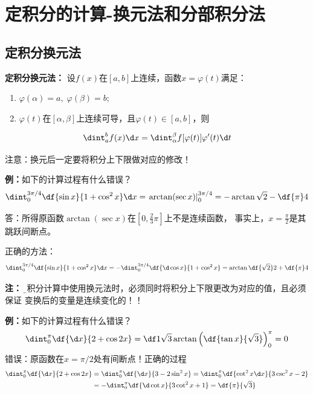 \section{定积分的计算-换元法和分部积分法}

\subsection{定积分换元法}

\begin{thx}
	{\bf 定积分换元法：}
	设$f(x)$在$[a,b]$上连续，函数$x=\varphi(t)$满足：
	\begin{enumerate}[(1)]
	  \setlength{\itemindent}{1cm}
	  \item $\varphi(\alpha)=a,\;\varphi(\beta)=b$;
	  \item $\varphi(t)$在$[\alpha,\beta]$上连续可导，且$\varphi(t)\in[a,b]$，则
	\end{enumerate}
	$$\dint_a^bf(x)\d
	x=\dint_{\alpha}^{\beta}f[\varphi(t)]\varphi'(t)\d t$$
\end{thx}

注意：换元后一定要将积分上下限做对应的修改！

{\bf 例：}如下的计算过程有什么错误？
$$\dint_0^{3\pi/4}\df{\sin x}{1+\cos^2x}\d x
=\left.\arctan(\sec x)\right|_0^{3\pi/4}=-\arctan\sqrt2-\df{\pi}4$$

答：所得原函数$\arctan(\sec x)$在$\left[0,\frac23\pi\right]$上不是连续函数，
事实上，$x=\frac{\pi}2$是其跳跃间断点。

正确的方法：
$$\dint_0^{3\pi/4}\df{\sin x}{1+\cos^2x}\d x
=-\dint_0^{3\pi/4}\df{\d\cos x}{1+\cos^2x}=\arctan\df{\sqrt2}2
+\df{\pi}4$$

{\bf 注：} {\b 定积分计算中使用换元法时，必须同时将积分上下限更改为对应的值，且必须保证
变换后的变量是连续变化的！！}

{\bf 例：}如下的计算过程有什么错误？
$$\dint_0^{\pi}\df{\d x}{2+\cos2x}=\df1{\sqrt3}\arctan
\left(\df{\tan x}{\sqrt3}\right)_0^{\pi}=0$$
错误：原函数在$x=\pi/2$处有间断点！正确的过程
\begin{align}
	\dint_0^{\pi}\df{\d x}{2+\cos2x}&=\dint_0^{\pi}\df{\d x}
	{3-2\sin^2x}=\dint_0^{\pi}\df{\cot^2x\d x}{3\csc^2x-2}\notag\\
	&=-\dint_0^{\pi}\df{\d\cot x}{3\cot^2x+1}=\df{\pi}{\sqrt3}\notag
\end{align}

% 

